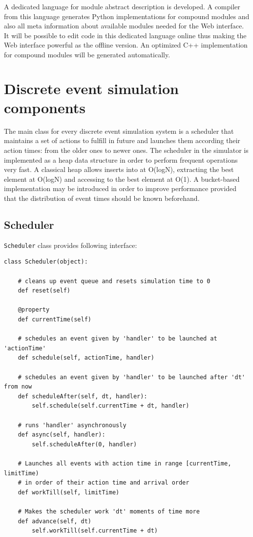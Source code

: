 \documentclass[a4paper,11pt]{article}
\begin{document}
A dedicated language for module abstract description is developed.
A compiler from this language generates Python implementations for
compound modules and also all meta information about available modules
needed for the Web interface. It will be possible to edit code in this
dedicated language online thus making the Web interface powerful as the
offline version. An optimized C++ implementation for compound modules
will be generated automatically.

\section{Discrete event simulation
components}\label{discrete-event-simulation-components}

The main class for every discrete event simulation system is a scheduler
that maintains a set of actions to fulfill in future and launches them
according their action times: from the older ones to newer ones. The
scheduler in the simulator is implemented as a heap data structure in
order to perform frequent operations very fast. A classical heap allows
inserts into at O(logN), extracting the best element at O(logN) and
accessing to the best element at O(1). A bucket-based implementation may
be introduced in order to improve performance provided that the
distribution of event times should be known beforehand.

\subsection{Scheduler}\label{scheduler}

\texttt{Scheduler} class provides following interface:
\begin{verbatim}
class Scheduler(object):

    # cleans up event queue and resets simulation time to 0
    def reset(self)

    @property
    def currentTime(self)

    # schedules an event given by 'handler' to be launched at 'actionTime'
    def schedule(self, actionTime, handler)

    # schedules an event given by 'handler' to be launched after 'dt' from now
    def scheduleAfter(self, dt, handler):
        self.schedule(self.currentTime + dt, handler)

    # runs 'handler' asynchronously
    def async(self, handler):
        self.scheduleAfter(0, handler)

    # Launches all events with action time in range [currentTime, limitTime)
    # in order of their action time and arrival order
    def workTill(self, limitTime)

    # Makes the scheduler work 'dt' moments of time more
    def advance(self, dt)
        self.workTill(self.currentTime + dt)
\end{verbatim}
\end{document}
